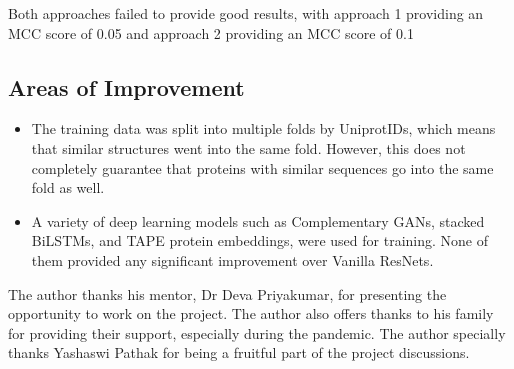\documentclass[journal=jacsat,manuscript=article]{achemso}
\begin{document}
Both approaches failed to provide good results, with approach 1 providing an MCC score of 0.05 and approach 2 providing an MCC score of 0.1

\subsection{Areas of Improvement}
\begin{itemize}
    \item The training data was split into multiple folds by UniprotIDs, which means that similar structures went into the same fold. However, this does not completely guarantee that proteins with similar sequences go into the same fold as well.
    \item A variety of deep learning models such as Complementary GANs, stacked BiLSTMs, and TAPE protein embeddings, were used for training. None of them provided any significant improvement over Vanilla ResNets.
\end{itemize}


\begin{acknowledgement}
    The author thanks his mentor, Dr Deva Priyakumar, for presenting the opportunity to work on the project. The author also offers thanks to his family for providing their support, especially during the pandemic. The author specially thanks Yashaswi Pathak for being a fruitful part of the project discussions.

\end{acknowledgement}

\newpage

\end{document}
